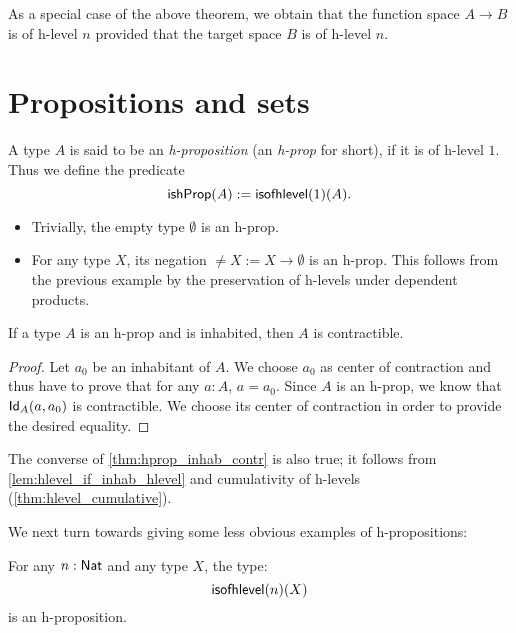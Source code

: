 \noindent
As a special case of the above theorem, we obtain that the function space $A \to B$ is of h-level $n$
provided that the target space $B$ is of h-level $n$.

\section{Propositions and sets}

\begin{defn}
 A type $A$ is said to be an \emph{h-proposition} (an \emph{h-prop} for short), if it is of h-level $1$.
  Thus we define the predicate
 \[\ishProp (A) := \isofhlevel(1)(A)  .\]
\end{defn}

\begin{egs}
 \begin{itemize}
  \item Trivially, the empty type $\emptyset$ is an h-prop.
  \item For any type $X$, its negation $\neq X := X \to \emptyset$ is an h-prop. This follows from the previous example by the preservation of h-levels under dependent products.
 \end{itemize}
\end{egs}

\begin{thm}\label{thm:hprop_inhab_contr}
 If a type $A$ is an h-prop and is inhabited, then $A$ is contractible.
\end{thm}

\begin{proof}
 Let $a_0$ be an inhabitant of $A$. We choose $a_0$ as center of contraction and thus have to
  prove that for any $a : A$, $a = a_0$.
  Since $A$ is an h-prop, we know that $\idtype[A]{a}{a_0}$ is contractible.
  We choose its center of contraction in order to provide the desired equality.
\end{proof}

\begin{rmk}
 The converse of \autoref{thm:hprop_inhab_contr} is also true; it follows from \autoref{lem:hlevel_if_inhab_hlevel} and cumulativity of h-levels (\autoref{thm:hlevel_cumulative}).
\end{rmk}

We next turn towards giving some less obvious examples of h-propositions:

\begin{thm}\label{thm:isaprop_isofhlevel}
 For any $n : \Nat$ and any type $X$, the type:
 \[ \isofhlevel(n)(X) \]
 is an h-proposition.
\end{thm}

